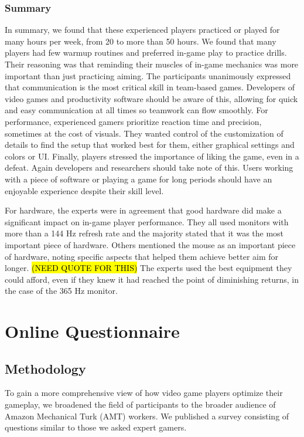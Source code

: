 \documentclass[11pt,manuscript,screen,review]{acmart} %
\begin{document}
\subsubsection{Summary}

In summary, we found that these experienced players practiced or played for many hours per week, from 20 to more than 50 hours. We found that many players had few warmup routines and preferred in-game play to practice drills. Their reasoning was that reminding their muscles of in-game mechanics was more important than just practicing aiming. The participants unanimously expressed that communication is the most critical skill in team-based games. Developers of video games and productivity software should be aware of this, allowing for quick and easy communication at all times so teamwork can flow smoothly. For performance, experienced gamers prioritize reaction time and precision, sometimes at the cost of visuals. They wanted control of the customization of details to find the setup that worked best for them, either graphical settings and colors or UI. Finally, players stressed the importance of liking the game, even in a defeat. Again developers and researchers should take note of this. Users working with a piece of software or playing a game for long periods should have an enjoyable experience despite their skill level. 

For hardware, the experts were in agreement that good hardware did make a significant impact on in-game player performance. They all used monitors with more than a 144 Hz refresh rate and the majority stated that it was the most important piece of hardware. Others mentioned the mouse as an important piece of hardware, noting specific aspects that helped them achieve better aim for longer. \hl{(NEED QUOTE FOR THIS)} The experts used the best equipment they could afford, even if they knew it had reached the point of diminishing returns, in the case of the 365 Hz monitor.  

\section{Online Questionnaire}

\subsection{Methodology}
To gain a more comprehensive view of how video game players optimize their gameplay, we broadened the field of participants to the broader audience of Amazon Mechanical Turk (AMT) workers. We published a survey consisting of questions similar to those we asked expert gamers. 
\end{document}
